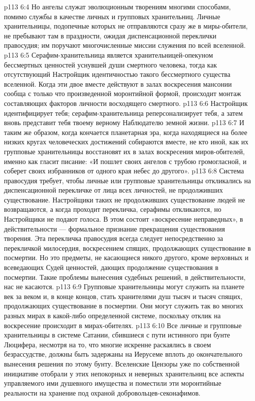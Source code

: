 \vs p113 6:4 \pc Но ангелы служат эволюционным творениям многими способами, помимо службы в качестве личных и групповых хранительниц. Личные хранительницы, подопечные которых не отправляются сразу же в миры\hyp{}обители, не пребывают там в праздности, ожидая диспенсационной переклички правосудия; им поручают многочисленные миссии служения по всей вселенной.
\vs p113 6:5 Серафим\hyp{}хранительница является хранительницей\hyp{}опекуном бессмертных ценностей уснувшей души смертного человека, тогда как отсутствующий Настройщик  идентичностью такого бессмертного существа вселенной. Когда эти двое вместе действуют в залах воскресения мансонии сообща с только что произведенной моронтийной формой, происходит монтаж составляющих факторов личности восходящего смертного.
\vs p113 6:6 Настройщик идентифицирует тебя; серафим\hyp{}хранительница реперсонализирует тебя, а затем вновь представит тебя твоему верному Наблюдателю земной жизни.
\vs p113 6:7 И таким же образом, когда кончается планетарная эра, когда находящиеся на более низких кругах человеческих достижений собираются вместе, не кто иной, как их групповые хранительницы восстановят их в залах воскресения миров\hyp{}обителей, именно как гласит писание: «И пошлет своих ангелов с трубою громогласной, и соберет своих избранников от одного края небес до другого».
\vs p113 6:8 \pc Система правосудия требует, чтобы личные или групповые хранительницы откликались на диспенсационной перекличке от лица всех личностей, не продолживших существование. Настройщики таких не продолживших существование людей не возвращаются, а когда проходит перекличка, серафимы откликаются, но Настройщики не подают голоса. В этом состоит «воскресение неправедных», в действительности --- формальное признание прекращения существования творения. Эта перекличка правосудия всегда следует непосредственно за перекличкой милосердия, воскресением спящих, продолжающих существование в посмертии. Но это предметы, не касающиеся никого другого, кроме верховных и всеведающих Судей ценностей, дающих продолжение существования в посмертии. Такие проблемы вынесения судебных решений, в действительности, нас не касаются.
\vs p113 6:9 \pc Групповые хранительницы могут служить на планете век за веком и, в конце концов, стать хранителями душ тысяч и тысяч спящих, продолжающих существование в посмертии. Они могут служить так во многих разных мирах в какой\hyp{}либо определенной системе, поскольку отклик на воскресение происходит в мирах\hyp{}обителях.
\vs p113 6:10 Все личные и групповые хранительницы в системе Сатании, сбившиеся с пути истинного при бунте Люцифера, несмотря на то, что многие искренне раскаялись в своем безрассудстве, должны быть задержаны на Иерусеме вплоть до окончательного вынесения решения по этому бунту. Вселенские Цензоры уже по собственной инициативе отобрали у этих непокорных и неверных хранительниц все аспекты управляемого ими душевного имущества и поместили эти моронтийные реальности на хранение под охраной добровольцев\hyp{}секонафимов.
